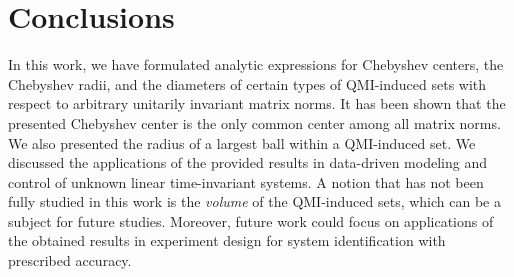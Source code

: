\documentclass[pdflatex,sn-mathphys-num]{sn-jnl}%
\theoremstyle{thmstyleone}
\begin{document}


\section{Conclusions}
\label{sec:VII}
In this work, we have formulated analytic expressions for Chebyshev centers, the Chebyshev radii, and the diameters of certain types of QMI-induced sets with respect to arbitrary unitarily invariant matrix norms. It has been shown that the presented Chebyshev center is the only common center among all matrix norms. We also presented the radius of a largest ball within a QMI-induced set. We discussed the applications of the provided results in data-driven modeling and control of unknown linear time-invariant systems. A notion that has not been fully studied in this work is the \emph{volume} of the QMI-induced sets, which can be a subject for future studies. Moreover, future work could focus on applications of the obtained results in experiment design for system identification with prescribed accuracy. 
\end{document}
